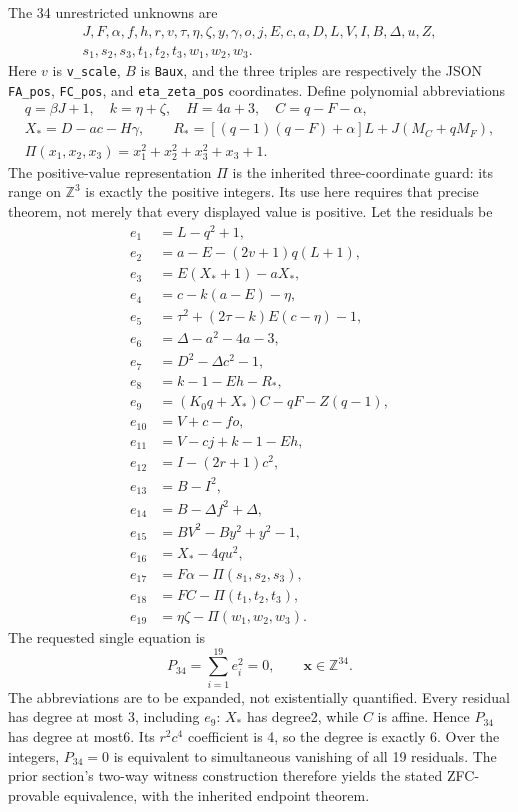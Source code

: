 \documentclass[11pt]{article}
\newcommand{\Z}{\mathbb Z}\newcommand{\N}{\mathbb N}
\begin{document}
The 34 unrestricted unknowns are
\[
\begin{gathered}
J,F,\alpha,f,h,r,v,\tau,\eta,\zeta,y,\gamma,o,j,E,c,a,D,L,V,I,B,\Delta,u,Z,\\
s_1,s_2,s_3,t_1,t_2,t_3,w_1,w_2,w_3.
\end{gathered}
\]
Here $v$ is \texttt{v\_scale}, $B$ is \texttt{Baux}, and the three triples
are respectively the JSON \texttt{FA\_pos}, \texttt{FC\_pos}, and
\texttt{eta\_zeta\_pos} coordinates. Define polynomial abbreviations
\[
\begin{gathered}
q=\beta J+1,\quad k=\eta+\zeta,\quad H=4a+3,\quad C=q-F-\alpha,\\
X_*=D-ac-H\gamma,\qquad
R_*=[(q-1)(q-F)+\alpha]L+J(M_C+qM_F),\\
\Pi(x_1,x_2,x_3)=x_1^2+x_2^2+x_3^2+x_3+1.
\end{gathered}
\]
The positive-value representation $\Pi$ is the inherited three-coordinate
guard: its range on $\Z^3$ is exactly the positive integers. Its use here
requires that precise theorem, not merely that every displayed value is
positive.
Let the residuals be
\begin{align*}
 e_1&=L-q^2+1,\\
 e_2&=a-E-(2v+1)q(L+1),\\
 e_3&=E(X_*+1)-aX_*,\\
 e_4&=c-k(a-E)-\eta,\\
 e_5&=\tau^2+(2\tau-k)E(c-\eta)-1,\\
 e_6&=\Delta-a^2-4a-3,\\
 e_7&=D^2-\Delta c^2-1,\\
 e_8&=k-1-Eh-R_*,\\
 e_9&=(K_0q+X_*)C-qF-Z(q-1),\\
 e_{10}&=V+c-fo,\\
 e_{11}&=V-cj+k-1-Eh,\\
 e_{12}&=I-(2r+1)c^2,\\
 e_{13}&=B-I^2,\\
 e_{14}&=B-\Delta f^2+\Delta,\\
 e_{15}&=BV^2-By^2+y^2-1,\\
 e_{16}&=X_*-4qu^2,\\
 e_{17}&=F\alpha-\Pi(s_1,s_2,s_3),\\
 e_{18}&=FC-\Pi(t_1,t_2,t_3),\\
 e_{19}&=\eta\zeta-\Pi(w_1,w_2,w_3).
\end{align*}
The requested single equation is
\[
\boxed{\quad P_{34}=\sum_{i=1}^{19}e_i^2=0,\qquad\boldsymbol{x}\in\Z^{34}.\quad}
\]
The abbreviations are to be expanded, not existentially quantified.
Every residual has degree at most 3, including $e_9$: $X_*$ has degree2,
while $C$ is affine. Hence $P_{34}$ has degree at most6. Its
$r^2c^4$ coefficient is 4, so the degree is exactly 6. Over the integers,
$P_{34}=0$ is equivalent to simultaneous vanishing of all 19 residuals.
The prior section's two-way witness construction therefore yields the stated
ZFC-provable equivalence, with the inherited endpoint theorem.
\end{document}
